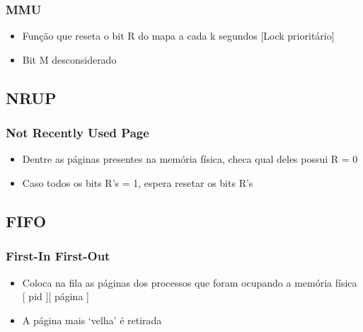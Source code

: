 \documentclass{beamer}
\begin{document}


\begin{frame}
\frametitle{MMU}
\begin{itemize}
\item Função que reseta o bit R do mapa a cada k segundos [Lock prioritário]

\item Bit M desconsiderado
\end{itemize}

\justifying
\end{frame}


\subsection{NRUP} 

\begin{frame}
\frametitle{Not Recently Used Page}
\begin{itemize}

\item Dentre as páginas presentes na memória física, checa qual deles possui R = 0

\item Caso todos os bits R’s = 1, espera resetar os bits R’s
\end{itemize}
\justifying
\end{frame}

\subsection{FIFO} 
\begin{frame}
\frametitle{First-In First-Out}
\begin{itemize}

\item Coloca na fila as páginas dos processos que foram ocupando a memória física
[ pid ][ página ] 

\item A página mais ‘velha’ é retirada
\end{itemize}
\justifying

\end{frame}
\end{document}
